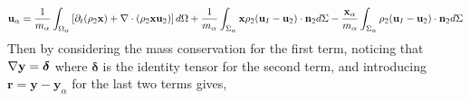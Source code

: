 \begin{equation}
    \textbf{u}_\alpha = \frac{1}{m_\alpha}\int_{\Omega_\alpha} \left[
        \partial_t (\rho_2 \textbf{x}) + \mathbf{\nabla}\cdot\left(\rho_2 \textbf{x}\textbf{u}_2\right) 
    \right]d\Omega \\
    + \frac{1}{m_\alpha}\int_{\Sigma_\alpha} \textbf{x} \rho_2(\textbf{u}_I   - \textbf{u}_2) \cdot \textbf{n}_2 d \Sigma
    -  \frac{\textbf{x}_\alpha}{m_\alpha}    \int_{\Sigma_\alpha} \rho_2(\textbf{u}_I   - \textbf{u}_2) \cdot \textbf{n}_2 d\Sigma 
\end{equation}
Then by considering the mass conservation for the first term, noticing that $\mathbf{\nabla} \textbf{y} = \bm\delta$ where $\bm\delta$ is the identity tensor for the second term, and introducing $\mathbf{r} = \mathbf{y} - \mathbf{y}_\alpha$ for the last two terms gives, 

